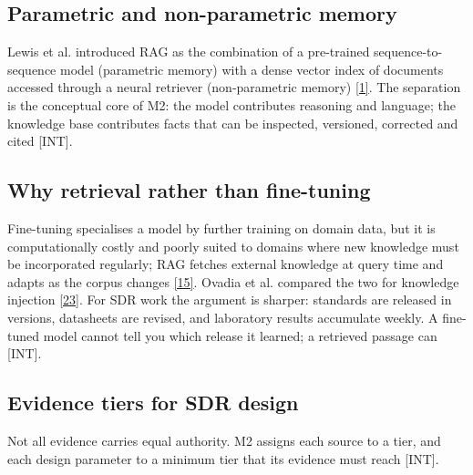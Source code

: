 \documentclass[11pt,a4paper]{article}
\newcommand{\prov}[1]{\textsf{\footnotesize[#1]}}
\begin{document}
\subsection{Parametric and non-parametric memory}
Lewis et al. introduced RAG as the combination of a pre-trained sequence-to-sequence model (parametric memory) with a dense vector index of documents accessed through a neural retriever (non-parametric memory) \hyperlink{ref1}{[1]}. The separation is the conceptual core of M2: the model contributes reasoning and language; the knowledge base contributes facts that can be inspected, versioned, corrected and cited \prov{INT}.

\subsection{Why retrieval rather than fine-tuning}
Fine-tuning specialises a model by further training on domain data, but it is computationally costly and poorly suited to domains where new knowledge must be incorporated regularly; RAG fetches external knowledge at query time and adapts as the corpus changes \hyperlink{ref15}{[15]}. Ovadia et al. compared the two for knowledge injection \hyperlink{ref23}{[23]}. For SDR work the argument is sharper: standards are released in versions, datasheets are revised, and laboratory results accumulate weekly. A fine-tuned model cannot tell you which release it learned; a retrieved passage can \prov{INT}.

\subsection{Evidence tiers for SDR design}
Not all evidence carries equal authority. M2 assigns each source to a tier, and each design parameter to a minimum tier that its evidence must reach \prov{INT}.
\end{document}

